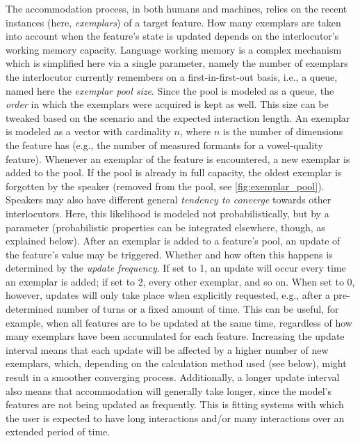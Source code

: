The accommodation process, in both humans and machines, relies on the recent instances (here, \textit{exemplars}) of a target feature.
How many exemplars are taken into account when the feature's state is updated depends on the interlocutor's working memory capacity.
Language working memory is a complex mechanism \citep[see][]{Baddeley2003working} which is simplified here via a single parameter, namely the number of exemplars the interlocutor currently remembers on a first-in-first-out basis, i.e., a queue, named here the \textit{exemplar pool size}.
Since the pool is modeled as a queue, the \emph{order} in which the exemplars were acquired is kept as well.
This size can be tweaked based on the scenario and the expected interaction length.
An exemplar is modeled as a vector with cardinality $n$, where $n$ is the number of dimensions the feature has (e.g., the number of measured formants for a vowel-quality feature).
Whenever an exemplar of the feature is encountered, a new exemplar is added to the pool.
If the pool is already in full capacity, the oldest exemplar is forgotten by the speaker (removed from the pool, see \cref{fig:exemplar_pool}).
Speakers may also have different general \textit{tendency to converge} towards other interlocutors.
Here, this likelihood is modeled not probabilistically, but by a parameter (probabilistic properties can be integrated elsewhere, though, as explained below).
After an exemplar is added to a feature's pool, an update of the feature's value may be triggered.
Whether and how often this happens is determined by the \textit{update frequency}.
If set to 1, an update will occur every time an exemplar is added; if set to 2, every other exemplar, and so on.
When set to 0, however, updates will only take place when explicitly requested, e.g., after a pre-determined number of turns or a fixed amount of time.
This can be useful, for example, when all features are to be updated at the same time, regardless of how many exemplars have been accumulated for each feature.
Increasing the update interval means that each update will be affected by a higher number of new exemplars, which, depending on the calculation method used (see below), might result in a smoother converging process.
Additionally, a longer update interval also means that accommodation will generally take longer, since the model's features are not being updated as frequently.
This is fitting systems with which the user is expected to have long interactions and/or many interactions over an extended period of time.

